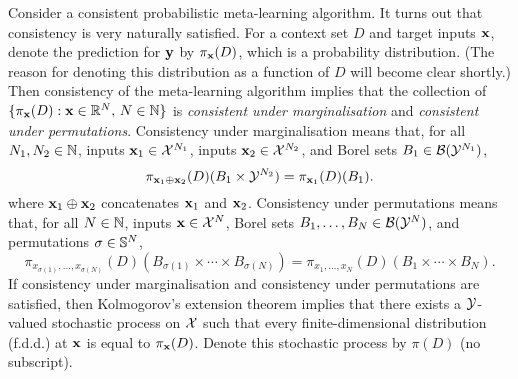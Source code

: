 \documentclass[12pt, twoside]{report}
\begin{document}
Consider a consistent probabilistic meta-learning algorithm.
It turns out that consistency is very naturally satisfied.
For a context set $D$ and target inputs $\vx$, denote the prediction for $\vy$ by $\pi_\vx(D)$, which is a probability distribution.
(The reason for denoting this distribution as a function of $D$ will become clear shortly.)
Then consistency of the meta-learning algorithm implies that the collection of $\set{\pi_\vx(D) : \vx \in \R^N,\, N \in \N}$ is \emph{consistent under marginalisation} and \emph{consistent under permutations}.
Consistency under marginalisation means that,
for all $N_1, N_2 \in \N$,
inputs $\vx_1 \in \X^{N_1}$,
inputs $\vx_2 \in \X^{N_2}$,
and Borel sets $B_1 \in \B(\Y^{N_1})$,
\begin{equation} \label{eq:consistency_under_marginalisation}
    \pi_{\vx_1 \oplus \vx_2}(D)(B_1 \times \Y^{N_2})
    = \pi_{\vx_1}(D)(B_1).
\end{equation}
where $\vx_1 \oplus \vx_2$ concatenates $\vx_1$ and $\vx_2$.
Consistency under permutations means that,
for all $N \in \N$,
inputs $\vx \in \X^{N}$,
Borel sets $B_1, \ldots, B_N \in \B(\Y^{N})$,
and permutations $\sigma \in \Sb^{N}$,
\begin{equation} \label{eq:consistency_under_permutation}
    \pi_{x_{\sigma(1)}, \ldots, x_{\sigma(N)}}(D)(B_{\sigma(1)} \times \cdots \times B_{\sigma(N)})
    = \pi_{x_1, \ldots, x_N}(D)(B_1 \times \cdots \times B_N).
\end{equation}
If consistency under marginalisation and consistency under permutations are satisfied,
then Kolmogorov's extension theorem \parencite[Theorem 12.1.2;][]{Dudley:2002:Real_Analysis_and_Probability} implies that there exists a $\Y$-valued stochastic process on $\X$ such that every finite-dimensional distribution (f.d.d.) at $\vx$ is equal to $\pi_\vx(D)$.
Denote this stochastic process by $\pi(D)$ (no subscript).
\end{document}
